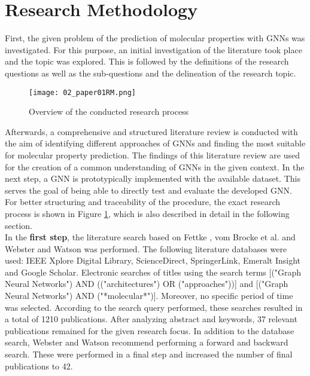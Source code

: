 \section{Research Methodology}
First, the given problem of the prediction of molecular properties with GNNs was investigated. For this purpose, an initial investigation of the literature took place and the topic was explored. This is followed by the definitions of the research questions as well as the sub-questions and the delineation of the research topic. \\

\begin{figure}[h]
    \centering
    \texttt{[image: 02\_paper01RM.png]}
    \caption[Overview of the conducted research process]{\label{img:paper01rm}{Overview of the conducted research process}}
    \end{figure} 

Afterwards, a comprehensive and structured literature review is conducted with the aim of identifying different approaches of GNNs and finding the most suitable for molecular property prediction. The findings of this literature review are used for the creation of a common understanding of GNNs in the given context. In the next step, a GNN is prototypically implemented with the available dataset. This serves the goal of being able to directly test and evaluate the developed GNN. For better structuring and traceability of the procedure, the exact research process is shown in Figure \ref{img:paper01rm}, which is also described in detail in the following section. \\

In the \textbf{first step}, the literature search based on Fettke \cite{fettke_state---art_2006}, vom Brocke et al. \cite{vom_brocke_reconstructing_nodate} and Webster and Watson \cite{webster_analyzing_2002} was performed. The following literature databases were used: IEEE Xplore Digital Library, ScienceDirect, SpringerLink, Emeralt Insight and Google Scholar. Electronic searches of titles using the search terms [("Graph Neural Networks") AND (("architectures") OR ("approaches"))] and [("Graph Neural Networks") AND ("*molecular*")]. Moreover, no specific period of time was selected. According to the search query performed, these searches resulted in a total of 1210 publications. After analyzing abstract and keywords, 37 relevant publications remained for the given research focus. In addition to the database search, Webster and Watson \cite{webster_analyzing_2002} recommend performing a forward and backward search. These were performed in a final step and increased the number of final publications to 42. \\

